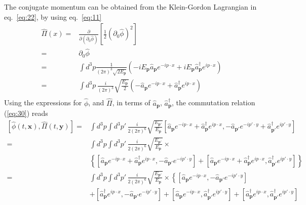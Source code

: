\begin{frame}
The conjugate momentum can be obtained from the Klein-Gordon Lagrangian in eq.~\eqref{eq:22}, 
by using eq.~\eqref{eq:11}
\begin{align}
  \widehat{\Pi}(x)=&\frac{\partial}{\partial(\partial_0\widehat{\phi})}\left[\tfrac{1}{2}(\partial_0\widehat{\phi})^2\right]\nonumber\\
  =&\partial_0\widehat{\phi}\nonumber\\
  =&\int d^3p \frac{1}{(2\pi)^3\sqrt{2E_{\mathbf{p}} }}
  \left(-i E_{\mathbf{p}}\widehat{a}_{\mathbf{p}} e^{-i p\cdot x }+iE_{\mathbf{p}}\widehat{a}_{\mathbf{p}}^\dagger e^{i p\cdot x }\right)\nonumber\\
  =&\int d^3p\,\frac{i}{(2\pi)^3}\sqrt{\frac{E_\mathbf{p}}{2}}
  \left(-\widehat{a}_{\mathbf{p}} e^{-i p\cdot x }+\widehat{a}_{\mathbf{p}}^\dagger e^{i p\cdot x }\right)\nonumber\\
\end{align}
Using the expressions for $\widehat{\phi}$, and $\widehat{\Pi}$, in terms of $\widehat{a}_\mathbf{p}$, $\widehat{a}_\mathbf{p}^\dagger$, the commutation relation (\ref{eq:30}) reads 
\begin{align}
\left[\widehat{\phi}(t,\mathbf{x}),\widehat{\Pi}(t,\mathbf{y})\right]=&
\int d^3p\int d^3p'\,\frac{i}{2(2\pi)^6}\sqrt{\frac{E_{\mathbf{p}'}}{E_{\mathbf{p}}}}
\left[\widehat{a}_\mathbf{p} e^{-i p\cdot x }+\widehat{a}_\mathbf{p}^\dagger e^{i p\cdot x },
-\widehat{a}_{\mathbf{p}'} e^{-i p'\cdot y }+\widehat{a}_{\mathbf{p}'}^\dagger e^{i p'\cdot y }\right]\nonumber\\
=&
\int d^3p\int d^3p'\,\frac{i}{2(2\pi)^6}\sqrt{\frac{E_{\mathbf{p}'}}{E_{\mathbf{p}}}}\times\nonumber\\
&\left\{ \left[\widehat{a}_\mathbf{p} e^{-i p\cdot x }+\widehat{a}_\mathbf{p}^\dagger e^{i p\cdot x },-\widehat{a}_{\mathbf{p}'} e^{-i p'\cdot y }\right]
+\left[\widehat{a}_\mathbf{p} e^{-i p\cdot x }+\widehat{a}_\mathbf{p}^\dagger e^{i p\cdot x },\widehat{a}_{\mathbf{p}'}^\dagger e^{i p'\cdot y }\right]\right\}\nonumber\\
=&
\int d^3p\int d^3p'\,\frac{i}{2(2\pi)^6}\sqrt{\frac{E_{\mathbf{p}'}}{E_{\mathbf{p}}}}\times\left\{ 
\left[\widehat{a}_\mathbf{p} e^{-i p\cdot x },-\widehat{a}_{\mathbf{p}'} e^{-i p'\cdot y }\right]\right.\nonumber\\
&\left.
+\left[\widehat{a}_\mathbf{p}^\dagger e^{i p\cdot x },-\widehat{a}_{\mathbf{p}'} e^{-i p'\cdot y }\right]
+\left[\widehat{a}_\mathbf{p} e^{-i p\cdot x },\widehat{a}_{\mathbf{p}'}^\dagger e^{i p'\cdot y }\right]
+\left[\widehat{a}_\mathbf{p}^\dagger e^{i p\cdot x },\widehat{a}_{\mathbf{p}'}^\dagger e^{i p'\cdot y }\right]

\end{align}
\end{frame}
